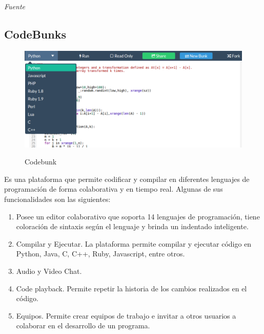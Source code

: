 \emph{Fuente} \cite{pinzas_desarrollo_2013}

\subsection{CodeBunks}
\begin{figure}[h]
  \centering
  \includegraphics[scale=0.3]{figuras/codebunk.png}\\
  \caption[CodeBunk]{Codebunk \protect\cite{codebunk}}\label{fig:codebunk}
\end{figure}
Es una plataforma que permite codificar y compilar en diferentes lenguajes de programación de forma colaborativa y en tiempo real. Algunas de sus funcionalidades son las siguientes:\\

\begin{enumerate}
  \item Posee un editor colaborativo que soporta 14 lenguajes de programación, tiene coloración de sintaxis según el lenguaje y brinda un indentado inteligente.
  \item Compilar y Ejecutar. La plataforma permite compilar y ejecutar código en Python, Java, C, C++, Ruby, Javascript, entre otros.
  \item Audio y Video Chat.
  \item Code playback. Permite repetir la historia de los cambios realizados en el código.
  \item Equipos. Permite crear equipos de trabajo e invitar a otros usuarios a colaborar en el desarrollo de un programa.
\end{enumerate}


\newpage
